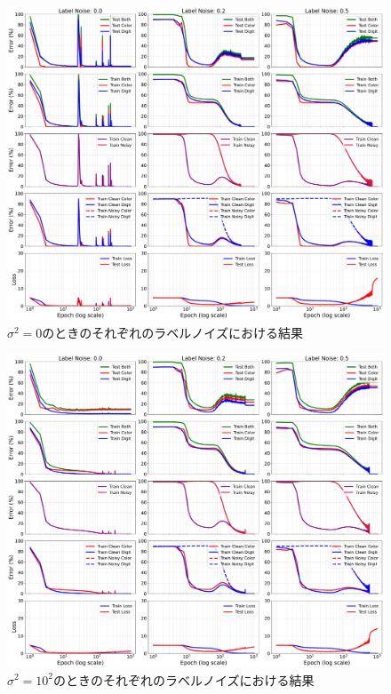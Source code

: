 \begin{figure}[H]
    \centering
    \includegraphics[width=\linewidth]{fig/erroe_metrics_by_variances/error_metrics_by_label_noise_variance_0.pdf}
    \caption{$\sigma^2 = 0$のときのそれぞれのラベルノイズにおける結果}
    \label{fig:errors_by_label_noise_variance_0}
\end{figure}

\begin{figure}[H]
    \centering
    \includegraphics[width=\linewidth]{fig/erroe_metrics_by_variances/error_metrics_by_label_noise_variance_1000.pdf}
    \caption{$\sigma^2 = 10^2$のときのそれぞれのラベルノイズにおける結果}
    \label{fig:errors_by_label_noise_variance_1000}
\end{figure}

